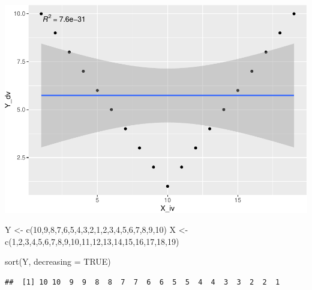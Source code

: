 \documentclass[
  english,
  man]{article}
\newenvironment{Shaded}{\begin{snugshade}}{\end{snugshade}}
\newcommand{\AttributeTok}[1]{\textcolor[rgb]{0.77,0.63,0.00}{#1}}
\newcommand{\ConstantTok}[1]{\textcolor[rgb]{0.00,0.00,0.00}{#1}}
\newcommand{\DecValTok}[1]{\textcolor[rgb]{0.00,0.00,0.81}{#1}}
\newcommand{\FunctionTok}[1]{\textcolor[rgb]{0.00,0.00,0.00}{#1}}
\newcommand{\NormalTok}[1]{#1}
\newcommand{\OtherTok}[1]{\textcolor[rgb]{0.56,0.35,0.01}{#1}}
\begin{document}
\includegraphics{CopyOflab12_files/figure-latex/unnamed-chunk-4-2.pdf}

\begin{Shaded}
\begin{Highlighting}[]
\NormalTok{Y }\OtherTok{\textless{}{-}} \FunctionTok{c}\NormalTok{(}\DecValTok{10}\NormalTok{,}\DecValTok{9}\NormalTok{,}\DecValTok{8}\NormalTok{,}\DecValTok{7}\NormalTok{,}\DecValTok{6}\NormalTok{,}\DecValTok{5}\NormalTok{,}\DecValTok{4}\NormalTok{,}\DecValTok{3}\NormalTok{,}\DecValTok{2}\NormalTok{,}\DecValTok{1}\NormalTok{,}\DecValTok{2}\NormalTok{,}\DecValTok{3}\NormalTok{,}\DecValTok{4}\NormalTok{,}\DecValTok{5}\NormalTok{,}\DecValTok{6}\NormalTok{,}\DecValTok{7}\NormalTok{,}\DecValTok{8}\NormalTok{,}\DecValTok{9}\NormalTok{,}\DecValTok{10}\NormalTok{)}
\NormalTok{X }\OtherTok{\textless{}{-}} \FunctionTok{c}\NormalTok{(}\DecValTok{1}\NormalTok{,}\DecValTok{2}\NormalTok{,}\DecValTok{3}\NormalTok{,}\DecValTok{4}\NormalTok{,}\DecValTok{5}\NormalTok{,}\DecValTok{6}\NormalTok{,}\DecValTok{7}\NormalTok{,}\DecValTok{8}\NormalTok{,}\DecValTok{9}\NormalTok{,}\DecValTok{10}\NormalTok{,}\DecValTok{11}\NormalTok{,}\DecValTok{12}\NormalTok{,}\DecValTok{13}\NormalTok{,}\DecValTok{14}\NormalTok{,}\DecValTok{15}\NormalTok{,}\DecValTok{16}\NormalTok{,}\DecValTok{17}\NormalTok{,}\DecValTok{18}\NormalTok{,}\DecValTok{19}\NormalTok{)}

\FunctionTok{sort}\NormalTok{(Y, }\AttributeTok{decreasing =} \ConstantTok{TRUE}\NormalTok{)}
\end{Highlighting}
\end{Shaded}

\begin{verbatim}
##  [1] 10 10  9  9  8  8  7  7  6  6  5  5  4  4  3  3  2  2  1
\end{verbatim}
\end{document}
